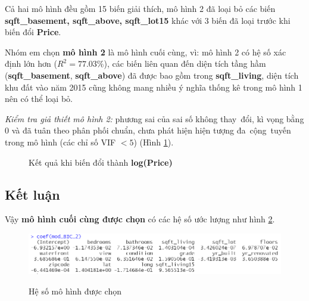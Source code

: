 Cả hai mô hình đều gồm 15 biến giải thích, mô hình 2 đã loại bỏ các biến \textbf{sqft\_basement, sqft\_above, sqft\_lot15} khác với 3 biến đã loại trước khi biến đổi \textbf{Price}. 

Nhóm em chọn \textbf{mô hình 2} là mô hình cuối cùng, vì: mô hình 2 có hệ số xác định lớn hơn ($R^2=77.03\%$), các biến liên quan đến diện tích tầng hầm (\textbf{sqft\_basement}, \textbf{sqft\_above}) đã được bao gồm trong \textbf{sqft\_living}, diện tích khu đất vào năm 2015 cũng không mang nhiều ý nghĩa thống kê trong mô hình 1 nên có thể loại bỏ.

\textit{Kiểm tra giả thiết mô hình 2:} phương sai của sai số không thay~đổi, kì vọng bằng 0 và đã tuân theo phân phối chuẩn, chưa phát hiện hiện tượng đa~cộng~tuyến trong mô hình (các chỉ số VIF $< 5$) (Hình \ref{B2_final}). 

 \begin{figure}[h!]
	\centering
	\hfill
	\caption{Kết quả khi biến đổi thành \textbf{log(Price)}}
	\label{B2_final}
\end{figure}
\subsection*{Kết luận}
Vậy \textbf{mô hình cuối cùng được chọn} có các hệ số ước lượng như hình \ref{B2_coef}.
\begin{figure}[h!]
	\centering
	{\includegraphics[width=\linewidth]{../Photo Of Result/B2_coef}}
	\caption{Hệ số mô hình được chọn}
	\label{B2_coef}
\end{figure}

